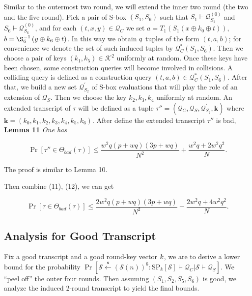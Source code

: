Similar to the outermost two round, we will extend the inner two round (the two and the five round).  Pick a pair of S-box $(S_1, S_6)$ such that $S_{1} \vdash \mathcal{Q}_{S_{1}}^{(0)}$ and $S_{6} \vdash \mathcal{Q}_{S_{6}}^{(0)}$, and for each $ (t, x, y) \in \mathcal{Q}_{C}$ we set $a=T_{1}\left(S_{1}\left(x \oplus k_{0} \oplus t\right)\right)$, $b=\S_{6}^{-1}\left(y \oplus k_{6} \oplus t\right)$. In this way we obtain $\mathnormal{q}$ tuples of the form $(t, a, b)$; for convenience we denote the set of such induced tuples by $\mathcal{Q}_{C}^{*}\left(S_{1}, S_{6}\right)$. Then we choose a pair of keys $\left(k_{1}, k_{5}\right) \in \mathcal{K}^{2}$ uniformly at random. Once these keys have been chosen, some construction queries will become involved in collisions. A colliding query is defined as a construction query $(t, a, b) \in \mathcal{Q}_{C}^{*}\left(S_{1}, S_{6}\right)$. After that, we build a new set $\mathcal{Q}_{S_{2}}^{\prime}$ of S-box evaluations that will play the role of an extension of $\mathcal{Q}_{S}$. Then we choose the key $k_2, k_3, k_4$ uniformly at random. An extended transcript of $\tau$ will be defined as a tuple $\tau''=\left(\mathcal{Q}_{C}, \mathcal{Q}_{S}, \mathcal{Q}_{S_{2}}^{\prime}, \mathbf{k}\right)$ where $\mathbf{k}=\left(k_{0}, k_{1}, k_{2},k_{3},k_{4}, k_{5}, k_{6}\right)$. After define the extended transcript $\tau''$ is bad, \\

\noindent \textbf{Lemma 11} \emph{One has}

\begin{equation}
\operatorname{Pr}[\tau'' \in \Theta_{bad}(\tau)] \leq \frac{w^2 q (p+w q) (3 p +w q)}{N^{2}} + \frac{w^{2} q + 2 w^2 q^2}{N}.
\end{equation}

\noindent The proof is similar to Lemma 10.

Then combine (11), (12), we can get

\begin{equation}
\operatorname{Pr}[\tau \in \Theta_{bad}(\tau)] \leq \frac{2w^2 q (p+w q) (3 p +w q)}{N^{2}} + \frac{2w^{2} q + 4 w^2 q^2}{N}.
\end{equation}


\subsection{Analysis for Good Transcript}

\noindent Fix a good transcript and a good round-key vector $\mathnormal{k}$, we are to derive a lower bound for the probability  $\operatorname{Pr}\left[\mathcal{S} \stackrel{\mathbf{s}}{\leftarrow}(\mathcal{S}(n))^{6}: \mathrm{SP}_{k}[\mathcal{S}] \vdash \mathcal{Q}_{C} | \mathcal{S} \vdash \mathcal{Q}_{S}\right]$. We ``peel off'' the outer four rounds. Then assuming $(S_{1}, S_2, S_{5}, S_6)$ is good, we analyze the induced 2-round transcript to yield the final bounds.\\

